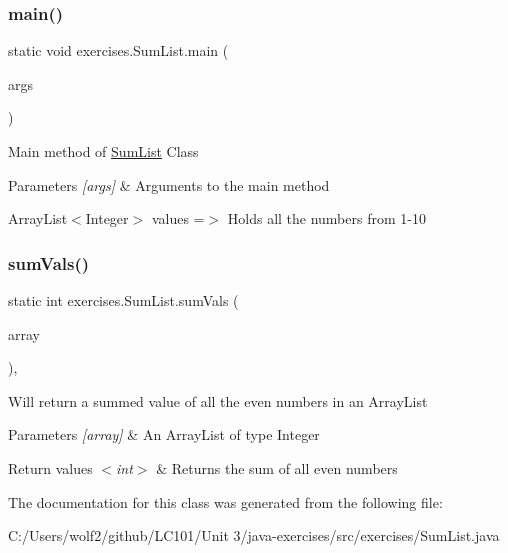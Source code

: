 \subsubsection{\texorpdfstring{main()}{main()}}
{\footnotesize\ttfamily static void exercises.\+Sum\+List.\+main (\begin{DoxyParamCaption}\item[{String \mbox{[}$\,$\mbox{]}}]{args }\end{DoxyParamCaption})\hspace{0.3cm}{\ttfamily [static]}}

Main method of \mbox{\hyperlink{classexercises_1_1_sum_list}{Sum\+List}} Class 
\begin{DoxyParams}{Parameters}
{\em \mbox{[}args\mbox{]}} & Arguments to the main method \\
\hline
\end{DoxyParams}
Array\+List$<$\+Integer$>$ values =$>$ Holds all the numbers from 1-\/10 \mbox{\label{classexercises_1_1_sum_list_a04969d5dd6fdae5d0a6b550c3dcd0bfc}} 
\subsubsection{\texorpdfstring{sumVals()}{sumVals()}}
{\footnotesize\ttfamily static int exercises.\+Sum\+List.\+sum\+Vals (\begin{DoxyParamCaption}\item[{Array\+List$<$ Integer $>$}]{array }\end{DoxyParamCaption})\hspace{0.3cm}{\ttfamily [static]}, {\ttfamily [private]}}

Will return a summed value of all the even numbers in an Array\+List 
\begin{DoxyParams}{Parameters}
{\em \mbox{[}array\mbox{]}} & An Array\+List of type Integer \\
\hline
\end{DoxyParams}

\begin{DoxyRetVals}{Return values}
{\em $<$int$>$} & Returns the sum of all even numbers \\
\hline
\end{DoxyRetVals}


The documentation for this class was generated from the following file\+:\begin{DoxyCompactItemize}
\item 
C\+:/\+Users/wolf2/github/\+L\+C101/\+Unit 3/java-\/exercises/src/exercises/Sum\+List.\+java\end{DoxyCompactItemize}
